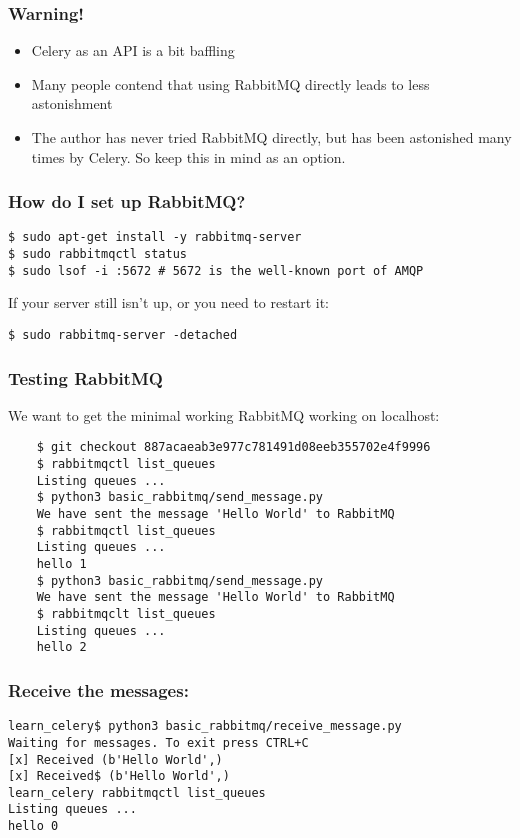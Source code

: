 \documentclass[9pt]{beamer}
\begin{document}
\begin{frame}[fragile]
  \frametitle{Warning!}
  \begin{itemize}
  \item Celery as an API is a bit baffling
    \pause
  \item Many people contend that using RabbitMQ directly leads to less astonishment
    \pause
  \item The author has never tried RabbitMQ directly, but has been astonished many times by Celery. So keep this in mind as an option.
  \end{itemize}
\end{frame}

\begin{frame}[fragile]
  \frametitle{How do I set up RabbitMQ?}
  \begin{verbatim}
$ sudo apt-get install -y rabbitmq-server
$ sudo rabbitmqctl status
$ sudo lsof -i :5672 # 5672 is the well-known port of AMQP
  \end{verbatim}
  If your server still isn't up, or you need to restart it:
  \begin{verbatim}
$ sudo rabbitmq-server -detached 
  \end{verbatim}
\end{frame}

\begin{frame}[fragile]
  \frametitle{Testing RabbitMQ}
  We want to get the minimal working RabbitMQ working on localhost:
  \begin{verbatim}
    $ git checkout 887acaeab3e977c781491d08eeb355702e4f9996
    $ rabbitmqctl list_queues
    Listing queues ...
    $ python3 basic_rabbitmq/send_message.py
    We have sent the message 'Hello World' to RabbitMQ
    $ rabbitmqctl list_queues
    Listing queues ...
    hello 1
    $ python3 basic_rabbitmq/send_message.py
    We have sent the message 'Hello World' to RabbitMQ
    $ rabbitmqclt list_queues
    Listing queues ...
    hello 2
  \end{verbatim}
\end{frame}

\begin{frame}[fragile]
  \frametitle{Receive the messages:}
  \begin{verbatim}
learn_celery$ python3 basic_rabbitmq/receive_message.py
Waiting for messages. To exit press CTRL+C
[x] Received (b'Hello World',)
[x] Received$ (b'Hello World',)
learn_celery rabbitmqctl list_queues
Listing queues ...
hello 0
  \end{verbatim}
\end{frame}
\end{document}
